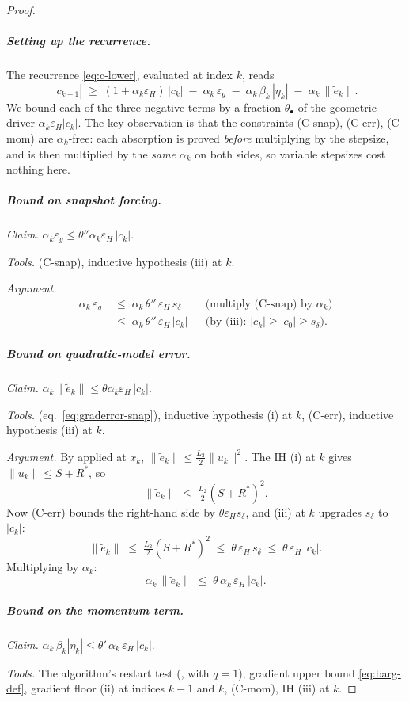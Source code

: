\documentclass[11pt,a4paper]{article}
\theoremstyle{plain}
\theoremstyle{definition}
\newcommand{\eps}{\varepsilon}
\newcommand{\epsg}{\eps_{g}}
\newcommand{\epsH}{\eps_{H}}
\newcommand{\Ltwo}{L_{2}}
\newcommand{\sdel}{s_{\delta}}
\newcommand{\Rstar}{R^{*}}
\begin{document}
\begin{proof}
\subparagraph{Setting up the recurrence.}
The recurrence \eqref{eq:c-lower}, evaluated at index $k$, reads
\begin{equation}\label{eq:c-recurrence-bis}
|c_{k+1}| \;\ge\; (1+\alpha_{k}\epsH)\,|c_k|
   \;-\; \alpha_{k}\,\epsg
   \;-\; \alpha_{k}\,\beta_k\,|\eta_k|
   \;-\; \alpha_{k}\,\|\tilde e_k\|.
\end{equation}
We bound each of the three negative terms by a fraction $\theta_\bullet$ of
the geometric driver $\alpha_{k}\epsH|c_k|$. The key observation is that the
constraints (C-snap), (C-err), (C-mom) are $\alpha_k$-free: each absorption is
proved \emph{before} multiplying by the stepsize, and is then multiplied by
the \emph{same} $\alpha_{k}$ on both sides, so variable stepsizes cost
nothing here.

\subparagraph{Bound on snapshot forcing.}
\emph{Claim.} $\alpha_k\epsg \le \theta''\alpha_k\epsH\,|c_k|$.

\emph{Tools.} (C-snap), inductive hypothesis (iii) at $k$.

\emph{Argument.}
\begin{align*}
\alpha_k\,\epsg
&\;\le\; \alpha_k\,\theta''\,\epsH\,\sdel &&\text{(multiply (C-snap) by }\alpha_k\text{)} \\
&\;\le\; \alpha_k\,\theta''\,\epsH\,|c_k| &&\text{(by (iii): } |c_k| \ge |c_0| \ge \sdel \text{)}.
\end{align*}

\subparagraph{Bound on quadratic-model error.}
\emph{Claim.} $\alpha_k\|\tilde e_k\| \le \theta\alpha_k\epsH\,|c_k|$.

\emph{Tools.}  (eq.~\eqref{eq:graderror-snap}),
inductive hypothesis (i) at $k$, (C-err), inductive hypothesis (iii) at $k$.

\emph{Argument.} By  applied at $x_k$,
$\|\tilde e_k\| \le \tfrac{\Ltwo}{2}\|u_k\|^2$. The IH (i) at $k$ gives
$\|u_k\| \le S+\Rstar$, so
\[
\|\tilde e_k\| \;\le\; \tfrac{\Ltwo}{2}(S+\Rstar)^2.
\]
Now (C-err) bounds the right-hand side by $\theta\epsH \sdel$, and (iii) at $k$
upgrades $\sdel$ to $|c_k|$:
\[
\|\tilde e_k\| \;\le\; \tfrac{\Ltwo}{2}(S+\Rstar)^2 \;\le\; \theta\,\epsH\,\sdel \;\le\; \theta\,\epsH\,|c_k|.
\]
Multiplying by $\alpha_k$:
\[
\alpha_k\,\|\tilde e_k\| \;\le\; \theta\,\alpha_k\,\epsH\,|c_k|.
\]

\subparagraph{Bound on the momentum term.}
\emph{Claim.} $\alpha_k\,\beta_k|\eta_k| \le \theta'\,\alpha_k\,\epsH\,|c_k|$.

\emph{Tools.} The algorithm's restart test (, with $q=1$),
gradient upper bound \eqref{eq:barg-def}, gradient floor (ii) at indices
$k-1$ and $k$, (C-mom), IH (iii) at $k$.


\end{proof}
\end{document}
